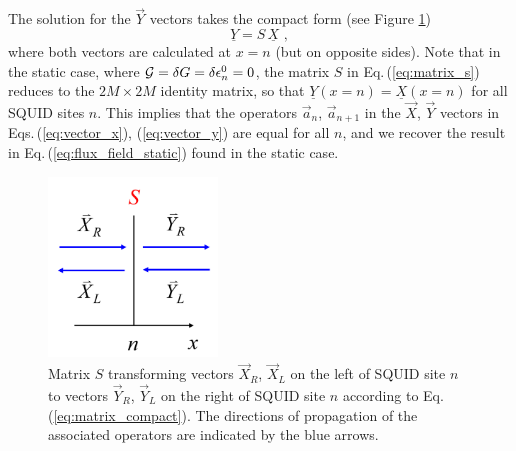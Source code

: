 The solution for the $\vec{Y}$ vectors takes the compact form (see Figure \ref{fig:xy})
%
\begin{equation} \label{eq:matrix_compact}
    \underline{Y} = S \, \underline{X} \, \, ,
\end{equation}
%
where both vectors are calculated at $x=n$ (but on opposite sides).
Note that in the static case, where ${\cal G} = \delta G = \delta \epsilon_n^0 = 0$,
the matrix
$S$ in Eq.\,(\ref{eq:matrix_s}) reduces to the $2M \times 2M$ identity matrix,
so that $\underline{Y}(x=n) = \underline{X}(x=n)$ for all SQUID sites $n$. 
This implies that the operators $\vec{a}_n$, $\vec{a}_{n+1}$ 
in the $\vec{X}$, $\vec{Y}$ vectors in Eqs.\,(\ref{eq:vector_x}), (\ref{eq:vector_y})
are equal for all $n$, and we recover the result in Eq.\,(\ref{eq:flux_field_static})
found in the static case. 

\begin{figure}
    \centering
    \includegraphics[width=0.4\textwidth, keepaspectratio]{figures/system/xy.png}
    \caption{Matrix $S$ transforming vectors $\vec{X}_R$, $\vec{X}_L$ on the left of SQUID site $n$
    to vectors $\vec{Y}_R$, $\vec{Y}_L$ on the right of SQUID site $n$ according to 
    Eq.\,(\ref{eq:matrix_compact}). The directions of propagation of the associated operators  
    are indicated by the blue arrows.}
    \label{fig:xy}
\end{figure}

